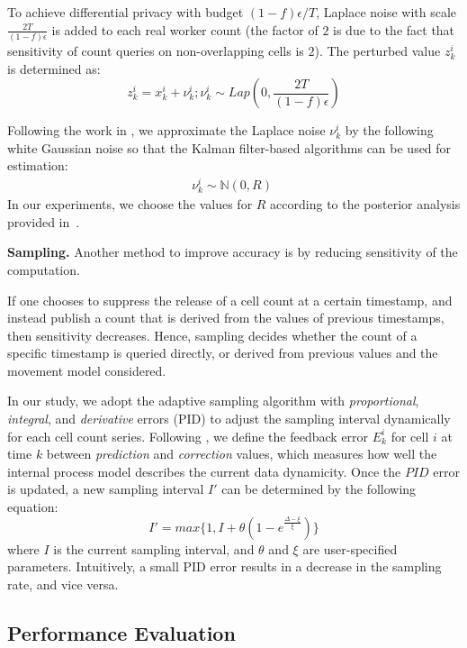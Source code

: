 \documentclass{USC-Thesis}
\numberwithin{equation}{chapter}
\begin{document}
To achieve differential privacy with budget $(1-f)\epsilon/T$, Laplace noise with scale $\frac{2T}{(1-f)\epsilon}$ is added to each real worker count (the factor of $2$ is due to the fact that sensitivity of count queries on non-overlapping cells is $2$). The perturbed value $z_k^i$ is determined as:
\begin{equation}
z_k^i = x_k^i + \nu_k^i ; \nu^i_k \sim Lap(0, \frac{2T}{(1-f)\epsilon}) 
\label{eq:measurement_model}
\end{equation}

Following the work in \cite{Fan14TKDE}, we approximate the Laplace noise $\nu_k^i$ by the following white Gaussian noise so that the Kalman filter-based algorithms can be used for estimation: 
\begin{align}
\nu^i_k \sim \mathbb{N}(0, R) \;
\end{align}
In our experiments, we choose the values for $R$ according to the posterior analysis provided in~\cite{Fan14TKDE}.


\noindent
\textbf{Sampling.} Another method to improve accuracy is by reducing sensitivity of the computation. 

If one chooses to suppress the release of a cell count at a certain timestamp, and instead publish a count that is derived from the values of previous timestamps, then sensitivity decreases. Hence, sampling decides whether the count of a specific timestamp is queried directly, or derived from previous values and the movement model considered. 

In our study, we adopt the adaptive sampling algorithm with \textit{proportional}, \textit{integral}, and \textit{derivative} errors (PID) to adjust the sampling interval dynamically for each cell count series. Following \cite{Fan14TKDE}, we define the feedback error $E_k^i$ for cell $i$ at time $k$ between \textit{prediction} and \textit{correction} values, which measures how well the internal process model describes the current data dynamicity.
  Once the $PID$ error is updated,  a new sampling interval $I'$ can be determined by the following equation:
\begin{equation}
I' = max\{1, I + \theta(1- e^{\frac{\Delta - \xi}{\xi}})\}
\end{equation} 
where $I$ is the current sampling interval, and $\theta$ and $\xi$ are user-specified parameters. 
  Intuitively, a small PID error results in a decrease in the sampling rate, and vice versa. 

\subsection{Performance Evaluation}
\label{sec:pe}
\end{document}
